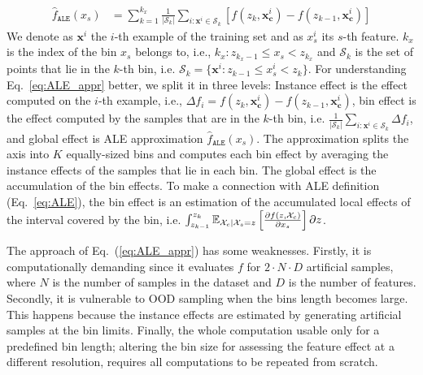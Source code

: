 \documentclass[wcp]{jmlr}
\newcommand{\xci}{\mathbf{x}^i_{\mathbf{c}}}
\newcommand{\xb}{\mathbf{x}} \newcommand{\R}{\mathbb{R}}
\newcommand{\E}{\mathbb{E}} \newcommand{\Jac}{\mathbf{J}}
\begin{document}
\begin{align}
  \hat{f}_{\mathtt{ALE}}(x_s) &= \sum_{k=1}^{k_x} \frac{1}{|\mathcal{S}_k|} \sum_{i:\xb^i \in \mathcal{S}_k} [f(z_k,\xci) - f(z_{k-1}, \xci)]
  \label{eq:ALE_appr}
\end{align}
%
We denote as \( \xb^i \) the \(i\)-th example of the training set and
as \(x_s^i\) its \(s\)-th feature. \(k_x\) is the index of the bin
\(x_s\) belongs to, i.e., \(k_x: z_{k_x-1} \leq x_s < z_{k_x} \) and
\(\mathcal{S}_k\) is the set of points that lie in the \(k\)-th bin,
i.e.  \( \mathcal{S}_k = \{ \xb^i : z_{k-1} \leq x^i_s < z_{k} \} \).
For understanding Eq.~\eqref{eq:ALE_appr} better, we split it in three
levels: Instance effect is the effect computed on the \(i\)-th
example, i.e., \(\Delta f_i = f(z_k,\xci) - f(z_{k-1}, \xci)\), bin
effect is the effect computed by the samples that are in the \(k\)-th
bin, i.e.
\(\frac{1}{|\mathcal{S}_k|} \sum_{i:\xb^i \in \mathcal{S}_k} \Delta
f_i \), and global effect is ALE approximation
\(\hat{f}_{\mathtt{ALE}}(x_s)\). The approximation splits the axis
into \( K \) equally-sized bins and computes each bin effect by
averaging the instance effects of the samples that lie in each
bin. The global effect is the accumulation of the bin effects. To make
a connection with ALE definition (Eq.~\ref{eq:ALE}), the bin effect is
an estimation of the accumulated local effects of the interval covered
by the bin, i.e.
\(\int_{z_{k-1}}^{z_k} \E_{\Xcb|\mathcal{X}_s=z}\left[\frac{\partial
    f(z,\Xcb)}{\partial x_s}\right] \partial z \).

The approach of Eq.~(\ref{eq:ALE_appr}) has some weaknesses. Firstly,
it is computationally demanding since it evaluates \(f\) for
\(2 \cdot N \cdot D\) artificial samples, where \(N\) is the number of
samples in the dataset and \(D\) is the number of features.  Secondly,
it is vulnerable to OOD sampling when the bins length becomes
large. This happens because the instance effects are estimated by
generating artificial samples at the bin limits. Finally, the whole
computation usable only for a predefined bin length; altering the bin
size for assessing the feature effect at a different resolution,
requires all computations to be repeated from scratch.
\end{document}
